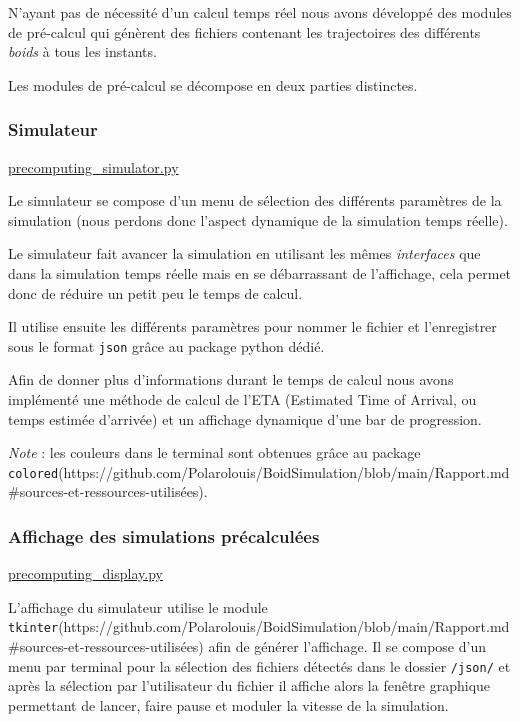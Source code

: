 \documentclass[
]{article}
\begin{document}
N'ayant pas de nécessité d'un calcul temps réel nous avons développé des
modules de pré-calcul qui génèrent des fichiers contenant les
trajectoires des différents \emph{boids} à tous les instants.

Les modules de pré-calcul se décompose en deux parties distinctes.

\hypertarget{simulateur}{%
\subsubsection{Simulateur}\label{simulateur}}

\href{https://github.com/Polarolouis/BoidSimulation/blob/9927037af0fde6ff9ab84311d5ce114de85f5d35/precomputing_simulator.py}{precomputing\_simulator.py}

Le simulateur se compose d'un menu de sélection des différents
paramètres de la simulation (nous perdons donc l'aspect dynamique de la
simulation temps réelle).

Le simulateur fait avancer la simulation en utilisant les mêmes
\emph{interfaces} que dans la simulation temps réelle mais en se
débarrassant de l'affichage, cela permet donc de réduire un petit peu le
temps de calcul.

Il utilise ensuite les différents paramètres pour nommer le fichier et
l'enregistrer sous le format \texttt{json} grâce au package python
dédié.

Afin de donner plus d'informations durant le temps de calcul nous avons
implémenté une méthode de calcul de l'ETA (Estimated Time of Arrival, ou
temps estimée d'arrivée) et un affichage dynamique d'une bar de
progression.

\emph{Note} : les couleurs dans le terminal sont obtenues grâce au
package
\texttt{colored}(https://github.com/Polarolouis/BoidSimulation/blob/main/Rapport.md\#sources-et-ressources-utilisées).

\hypertarget{affichage-des-simulations-pruxe9calculuxe9es}{%
\subsubsection{Affichage des simulations
précalculées}\label{affichage-des-simulations-pruxe9calculuxe9es}}

\href{https://github.com/Polarolouis/BoidSimulation/blob/9927037af0fde6ff9ab84311d5ce114de85f5d35/precomputing_display.py}{precomputing\_display.py}

L'affichage du simulateur utilise le module
\texttt{tkinter}(https://github.com/Polarolouis/BoidSimulation/blob/main/Rapport.md\#sources-et-ressources-utilisées)
afin de générer l'affichage. Il se compose d'un menu par terminal pour
la sélection des fichiers détectés dans le dossier \texttt{/json/} et
après la sélection par l'utilisateur du fichier il affiche alors la
fenêtre graphique permettant de lancer, faire pause et moduler la
vitesse de la simulation.
\end{document}
